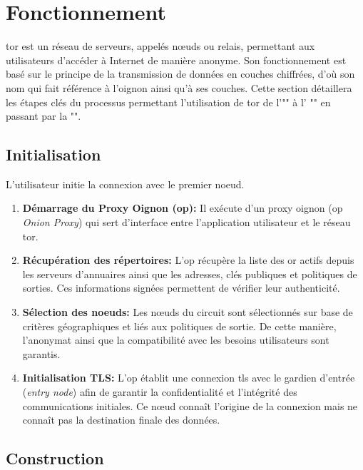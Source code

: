 \section{Fonctionnement}\label{sec:works}

\acrshort{tor} est un réseau de serveurs, appelés nœuds ou relais, permettant aux utilisateurs d'accéder à Internet de manière anonyme.
Son fonctionnement est basé sur le principe de la transmission de données en couches chiffrées, d'où son nom qui fait référence à l'oignon ainsi qu'à ses couches. 
Cette section détaillera les étapes clés du processus permettant l'utilisation de \acrshort{tor} de l'"" à l' "" en passant par la "".

\subsection{Initialisation}\label{subsec:initialisation}

L'utilisateur initie la connexion avec le premier noeud.
\begin{enumerate}
  \item \textbf{Démarrage du Proxy Oignon (\acrshort{op}):} Il exécute d'un proxy oignon (\acrshort{op} \textit{Onion Proxy}) qui sert d'interface entre l'application utilisateur et le réseau \acrshort{tor}. 
  \item \textbf{Récupération des répertoires:} L'\acrshort{op} récupère la liste des  \acrshort{or}  actifs depuis les serveurs d'annuaires ainsi que les adresses, clés publiques et politiques de sorties.
  Ces informations signées permettent de vérifier leur authenticité.
  \item \textbf{Sélection des noeuds:}
  Les n\oe uds du circuit sont sélectionnés sur base de critères géographiques et liés aux politiques de sortie. De cette manière, l'anonymat ainsi que la compatibilité avec les besoins utilisateurs sont garantis.
  \item \textbf{Initialisation TLS:} L'\acrshort{op} établit une connexion \acrshort{tls} avec le gardien d'entrée (\textit{entry node}) afin de garantir la confidentialité et l'intégrité des communications initiales.
  Ce nœud connaît l'origine de la connexion mais ne connaît pas la destination finale des données.
\end{enumerate}

\subsection{Construction}\label{subsec:construction}

